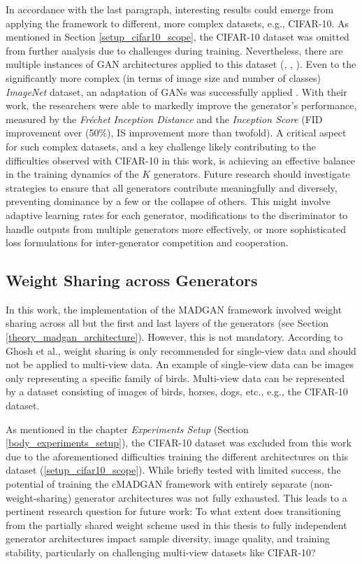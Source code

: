In accordance with the last paragraph, interesting results could emerge from applying the framework to different, more complex datasets, e.g., CIFAR-10. As mentioned in Section \ref{setup_cifar10_scope}, the CIFAR-10 dataset was omitted from further analysis due to challenges during training. Nevertheless, there are multiple instances of GAN architectures applied to this dataset (\cite{salimans2016improvedtechniquestraininggans}, \cite{denton2015deepgenerativeimagemodels}, \cite{gong2019autoganneuralarchitecturesearch}). Even to the significantly more complex (in terms of image size and number of classes) \textit{ImageNet} dataset, an adaptation of GANs was successfully applied \cite{brock2019largescalegantraining}. With their work, the researchers were able to markedly improve the generator's performance, measured by the \textit{Fréchet Inception Distance} and the \textit{Inception Score} (FID improvement over (50\%), IS improvement more than twofold). A critical aspect for such complex datasets, and a key challenge likely contributing to the difficulties observed with CIFAR-10 in this work, is achieving an effective balance in the training dynamics of the \(K\) generators. Future research should investigate strategies to ensure that all generators contribute meaningfully and diversely, preventing dominance by a few or the collapse of others. This might involve adaptive learning rates for each generator, modifications to the discriminator to handle outputs from multiple generators more effectively, or more sophisticated loss formulations for inter-generator competition and cooperation.


\subsection{Weight Sharing across Generators}
In this work, the implementation of the MADGAN framework involved weight sharing across all but the first and last layers of the generators (see Section \ref{theory_madgan_architecture}). However, this is not mandatory. According to Ghosh et al., weight sharing is only recommended for single-view data and should not be applied to multi-view data. An example of single-view data can be images only representing a specific family of birds. Multi-view data can be represented by a dataset consisting of images of birds, horses, dogs, etc., e.g., the CIFAR-10 dataset.

As mentioned in the chapter \textit{Experiments Setup} (Section \ref{body_experiments_setup}), the CIFAR-10 dataset was excluded from this work due to the aforementioned difficulties training the different architectures on this dataset (\ref{setup_cifar10_scope}). While briefly tested with limited success, the potential of training the cMADGAN framework with entirely separate (non-weight-sharing) generator architectures was not fully exhausted. This leads to a pertinent research question for future work: To what extent does transitioning from the partially shared weight scheme used in this thesis to fully independent generator architectures impact sample diversity, image quality, and training stability, particularly on challenging multi-view datasets like CIFAR-10? 

